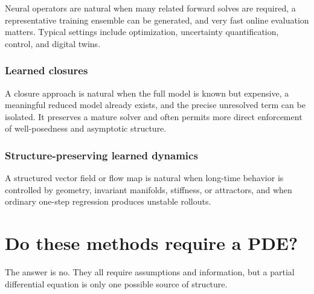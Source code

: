 \documentclass[11pt]{article}
\begin{document}
Neural operators are natural when many related forward solves are required, a representative training ensemble can be generated, and very fast online evaluation matters. Typical settings include optimization, uncertainty quantification, control, and digital twins.

\subsubsection{Learned closures}

A closure approach is natural when the full model is known but expensive, a meaningful reduced model already exists, and the precise unresolved term can be isolated. It preserves a mature solver and often permits more direct enforcement of well-posedness and asymptotic structure.

\subsubsection{Structure-preserving learned dynamics}

A structured vector field or flow map is natural when long-time behavior is controlled by geometry, invariant manifolds, stiffness, or attractors, and when ordinary one-step regression produces unstable rollouts.

\section{Do these methods require a PDE?}

The answer is no. They all require assumptions and information, but a partial differential equation is only one possible source of structure.
\end{document}
